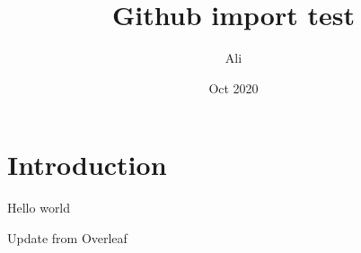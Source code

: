\documentclass{article}
\title{Github import test}
\author{Ali}
\date{Oct 2020}
\begin{document}
\maketitle

\section{Introduction}

Hello world

Update from Overleaf
\end{document}
